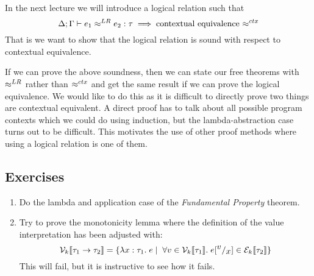 In the next lecture we will introduce a logical relation such that
\[
  \Delta ; \Gamma \vdash e_1 \approx^{LR} e_2 : \tau \implies \text{contextual equivalence \ensuremath{ \approx^{ctx} }} 
\]
That is we want to show that the logical relation is sound with respect to contextual equivalence. 

If we can prove the above soundness, then we can state our free theorems with $ \approx^{LR} $ rather than $ \approx^{ctx} $ and get the same result if we can prove the logical equivalence. We would like to do this as it is difficult to directly prove two things are contextual equivalent. A direct proof has to talk about all possible program contexts which we could do using induction, but the lambda-abstraction case turns out to be difficult. This motivates the use of other proof methods where using a logical relation is one of them.

\subsection*{Exercises}
\begin{enumerate}
\item Do the lambda and application case of the \emph{Fundamental Property} theorem.%
\item Try to prove the monotonicity lemma where the definition of the value interpretation has been adjusted with:
\[
\mathcal{V}_{k}\llbracket  \tau_1 \rightarrow \tau_2 \rrbracket = \{\lambda x : \tau_1 . \; e \; | \; \; \forall v \in \mathcal{V}_{k}\llbracket \tau_1 \rrbracket. \; e[^{\textstyle v}/_{\textstyle x}] \in \mathcal{E}_{k}\llbracket \tau_2 \rrbracket \}
\]
This will fail, but it is instructive to see how it fails.
\end{enumerate}


\clearpage
